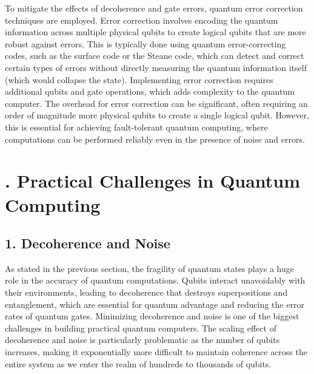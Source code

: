 \documentclass{elbioimp2}
\begin{document}
To mitigate the effects of decoherence and gate errors, quantum error correction techniques are employed. Error correction involves encoding the quantum information across multiple physical qubits to create logical qubits that are more robust against errors. This is typically done using quantum error-correcting codes, such as the surface code or the Steane code, which can detect and correct certain types of errors without directly measuring the quantum information itself (which would collapse the state). Implementing error correction requires additional qubits and gate operations, which adds complexity to the quantum computer. The overhead for error correction can be significant, often requiring an order of magnitude more physical qubits to create a single logical qubit. However, this is essential for achieving fault-tolerant quantum computing, where computations can be performed reliably even in the presence of noise and errors.


\section{. Practical Challenges in Quantum Computing}
\subsection{1. Decoherence and Noise}
As stated in the previous section, the fragility of quantum states plays a huge role in the accuracy of quantum computations. Qubits interact unavoidably with their environments, leading to decoherence that destroys superpositions and entanglement, which are essential for quantum advantage and reducing the error rates of quantum gates. Minimizing decoherence and noise is one of the biggest challenges in building practical quantum computers. The scaling effect of decoherence and noise is particularly problematic as the number of qubits increases, making it exponentially more difficult to maintain coherence across the entire system as we enter the realm of hundreds to thousands of qubits.
\end{document}
